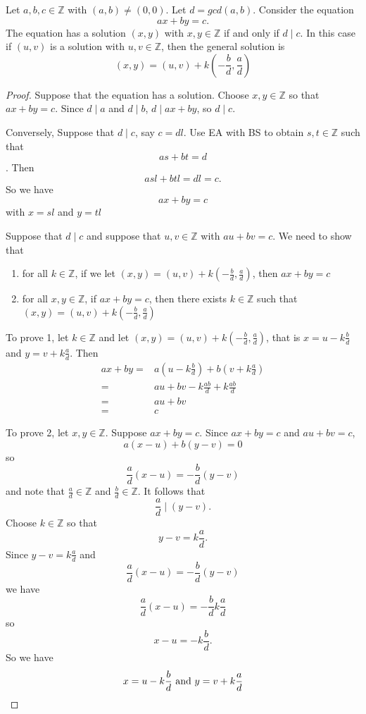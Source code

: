 
\begin{thm}
Let $a,b,c\in\mathbb{Z}$ with $(a,b)\neq (0,0)$. Let $d = gcd(a,b)$. Consider the equation \[ax+by =c.\] The equation has a solution $(x,y)$ with $x,y\in\mathbb{Z}$ if and only if $d\mid c$. In this case if $(u,v)$ is a solution with $u,v\in\mathbb{Z}$, then the general solution is \[(x,y) = (u,v) + k (-\frac{b}{d},\frac{a}{d})\] 
\end{thm}

\begin{proof}
Suppose that the equation has a solution. Choose $x,y\in\mathbb{Z}$ so that $ax+by = c$. Since $d\mid a$ and $d\mid b$, $d\mid ax+by$, so $d\mid c$.

Conversely, Suppose that $d\mid c$, say $c = dl$. Use EA with BS to obtain $s,t\in\mathbb{Z}$ such that \[as+bt = d\]. Then \[asl+btl=dl=c.\] So we have \[ax+by = c\] with $x=sl$ and $y=tl$

Suppose that $d\mid c $ and suppose that $u,v\in\mathbb{Z}$ with $au+bv = c$. We need to show that 
\begin{enumerate}
\item for all $k\in\mathbb{Z}$, if we let $(x,y) = (u,v) + k (-\frac{b}{d},\frac{a}{d})$, then $ax+by = c$
\item for all $x,y\in\mathbb{Z}$, if $ax+by = c$, then there exists $k\in\mathbb{Z}$ such that $(x,y) = (u,v) + k (-\frac{b}{d},\frac{a}{d})$
\end{enumerate}

To prove 1, let $k\in\mathbb{Z}$ and let $(x,y) = (u,v) + k (-\frac{b}{d},\frac{a}{d})$, that is $x = u-k\frac{b}{d}$ and $y = v+k\frac{a}{d}$. Then
\begin{align*}
    ax+by = & a (u-k\frac{b}{d}) + b(v+k\frac{a}{d}) \\
    =& au + bv - k \frac{ab}{d}+ k \frac{ab}{d} \\
    = & au+bv \\
    = & c
\end{align*}

To prove 2, let $x,y\in\mathbb{Z}$. Suppose $ax+by = c$. Since $ax+by = c$ and $au+bv = c$, \[a(x-u) + b(y-v) = 0\] so \[\frac{a}{d}(x-u) = -\frac{b}{d}(y-v)\] and note that $\frac{a}{d} \in\mathbb{Z}$ and $\frac{b}{d}\in\mathbb{Z}$. It follows that \[\frac{a}{d}\mid (y-v).\] Choose $k\in\mathbb{Z}$ so that \[y-v = k\frac{a}{d}.\] Since $y-v = k\frac{a}{d}$ and \[\frac{a}{d}(x-u) = -\frac{b}{d} (y-v)\] we have \[\frac{a}{d}(x-u) = -\frac{b}{d}k\frac{a}{d}\] so \[x-u = -k\frac{b}{d}.\] So we have \[x=u-k\frac{b}{d} \text{ and } y = v + k \frac{a}{d} \qedhere\]

\end{proof}

